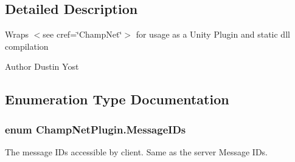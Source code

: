 \subsection{Detailed Description}
Wraps $<$see cref=\char`\"{}\-Champ\-Net\char`\"{}$>$ for usage as a Unity Plugin and static dll compilation \begin{DoxyAuthor}{Author}
Dustin Yost 
\end{DoxyAuthor}


\subsection{Enumeration Type Documentation}
\hypertarget{namespace_champ_net_plugin_a2ade5cfa7cf6c25ab7236c6b54a57821}{
\subsubsection[{Message\-I\-Ds}]{\setlength{\rightskip}{0pt plus 5cm}enum {\bf Champ\-Net\-Plugin.\-Message\-I\-Ds}}}\label{namespace_champ_net_plugin_a2ade5cfa7cf6c25ab7236c6b54a57821}


The message I\-Ds accessible by client. Same as the server Message I\-Ds. 

